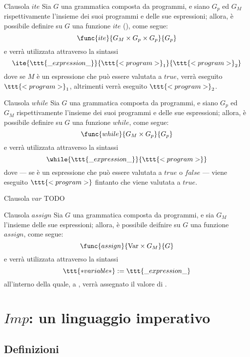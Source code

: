 \documentclass[a4paper, 12pt]{report}
\begin{document}
    \begin{frameddefn}{Clausola $ite$}
        Sia $G$ una grammatica composta da programmi, e siano $G_p$ ed $G_M$ rispettivamente l'insieme dei suoi programmi e delle sue espressioni; allora, è possibile definire su $G$ una funzione $ite$ (), come segue: $$\func{ite}{G_M \times G_p \times G_p}{G_p}$$ e verrà utilizzata attraverso la sintassi $$\ite{\ttt{\_expression\_}}{\ttt{<program>}_1}{\ttt{<program>}_2}$$ dove se $M$ è un espressione che può essere valutata a $true$, verrà eseguito $\ttt{<program>}_1$, altrimenti verrà eseguito $\ttt{<program>}_2$.
    \end{frameddefn}

    \begin{frameddefn}{Clausola $while$}
        Sia $G$ una grammatica composta da programmi, e siano $G_p$ ed $G_M$ rispettivamente l'insieme dei suoi programmi e delle sue espressioni; allora, è possibile definire su $G$ una funzione $while$, come segue: $$\func{while}{G_M \times G_p}{G_p}$$ e verrà utilizzata attraverso la sintassi $$\while{\ttt{\_expression\_}}{\ttt{<program>}}$$ dove --- se  è un espressione che può essere valutata a $true$ o $false$ --- viene eseguito $\ttt{<program>}$ fintanto che  viene valutata a $true$.
    \end{frameddefn}

    \begin{frameddefn}{Clausola $var$}
        TODO
    \end{frameddefn}

    \begin{frameddefn}{Clausola $assign$}
        Sia $G$ una grammatica composta da programmi, e sia $G_M$ l'insieme delle sue espressioni; allora, è possibile deifnire su $G$ una funzione $assign$, come segue: $$\func{assign}{\mathrm{Var} \times G_M}{G}$$ e verrà utilizzata attraverso la sintassi $$\ttt{*variable*}  := \ttt{\_expression\_}$$ all'interno della quale, a , verrà assegnato il valore di .
    \end{frameddefn}

    \section{$Imp$: un linguaggio imperativo}

    \subsection{Definizioni}
\end{document}
